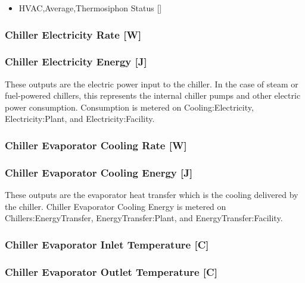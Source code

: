 \begin{itemize}
    \item
    HVAC,Average,Thermosiphon Status {[]}
\end{itemize}

\subsubsection{Chiller Electricity Rate {[}W{]}}\label{chiller-electric-power-w}

\subsubsection{Chiller Electricity Energy {[}J{]}}\label{chiller-electric-energy-j}

These outputs are the electric power input to the chiller. In the case of steam or fuel-powered chillers, this represents the internal chiller pumps and other electric power consumption. Consumption is metered on Cooling:Electricity, Electricity:Plant, and Electricity:Facility.

\subsubsection{Chiller Evaporator Cooling Rate {[}W{]}}\label{chiller-evaporator-cooling-rate-w}

\subsubsection{Chiller Evaporator Cooling Energy {[}J{]}}\label{chiller-evaporator-cooling-energy-j}

These outputs are the evaporator heat transfer which is the cooling delivered by the chiller. Chiller Evaporator Cooling Energy is metered on Chillers:EnergyTransfer, EnergyTransfer:Plant, and EnergyTransfer:Facility.

\subsubsection{Chiller Evaporator Inlet Temperature {[}C{]}}\label{chiller-evaporator-inlet-temperature-c}

\subsubsection{Chiller Evaporator Outlet Temperature {[}C{]}}\label{chiller-evaporator-outlet-temperature-c}


